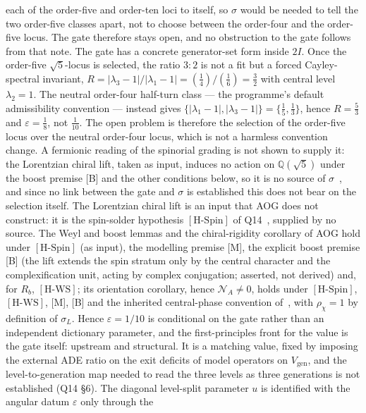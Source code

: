 \documentclass[11pt,a4paper]{article}
\theoremstyle{definition}
\newcommand{\HSpin}{\ensuremath{[\mathrm{H\text{-}Spin}]}}
\newcommand{\HWS}{\ensuremath{[\mathrm{H\text{-}WS}]}}
\begin{document}
      each of the order-five and order-ten loci to itself, so $\sigma$ would be needed to tell the two order-five
      classes apart, not to choose between the order-four and the order-five locus.
      The gate therefore stays open, and no obstruction to the gate follows from that note.
      The gate has a concrete generator-set form inside $2I$.
      Once the order-five $\sqrt{5}$-locus is selected, the ratio $3:2$ is not a fit but a forced Cayley-spectral
      invariant, $R=|\lambda_3-1|/|\lambda_1-1|=(\tfrac14)/(\tfrac16)=\tfrac32$ with central level $\lambda_2=1$.
      The neutral order-four half-turn class --- the programme's default admissibility convention --- instead gives
      $\{|\lambda_1-1|,|\lambda_3-1|\}=\{\tfrac15,\tfrac13\}$, hence $R=\tfrac53$ and $\varepsilon=\tfrac18$, not
      $\tfrac1{10}$.
      The open problem is therefore the selection of the order-five locus over the neutral order-four locus, which is
      not a harmless convention change.
      A fermionic reading of the spinorial grading is not shown to supply it: the Lorentzian chiral lift, taken as
      input, induces no action on $\mathbb{Q}(\sqrt{5})$ under the boost premise [B] and the other conditions below, so it is no source of
      $\sigma$~\cite{Beau2026aog}, and since no link between the gate and $\sigma$ is established this does not bear
      on the selection itself.
      The Lorentzian chiral lift is an input that AOG does not construct: it is the spin-solder hypothesis \HSpin{} of
      Q14~\cite{Beau2026q14}, supplied by no source.
      The Weyl and boost lemmas and the chiral-rigidity corollary of AOG hold under \HSpin{} (as input), the modelling
      premise [M], the explicit boost premise [B] (the lift extends the spin stratum only by the central character and the
      complexification unit, acting by complex conjugation; asserted, not derived) and, for $R_b$, \HWS{}; its orientation
      corollary, hence $\mathcal N_A\neq0$, holds under \HSpin{}, \HWS{}, [M], [B] and the inherited
      central-phase convention of~\cite{Beau2026cho}, with $\rho_\chi=1$ by definition of $\sigma_L$.
      Hence $\varepsilon=1/10$ is conditional on the gate rather than an independent dictionary parameter, and the
      first-principles front for the value is the gate itself: upstream and structural.
      It is a matching value, fixed by imposing the external ADE ratio on the exit deficits of model operators on
      $V_{\mathrm{gen}}$, and the level-to-generation map needed to read the three levels as three generations is not
      established (Q14 \S6).
      The diagonal level-split parameter $u$ is identified with the angular datum $\varepsilon$ only through the
\end{document}
